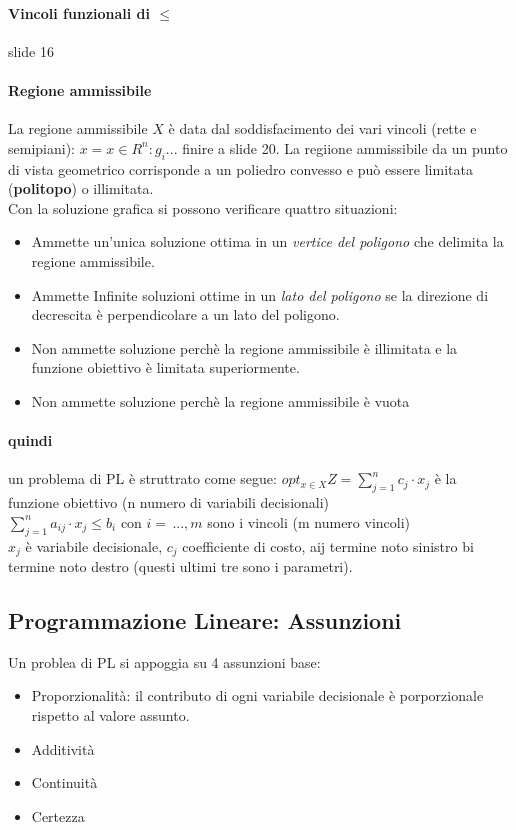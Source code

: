 \documentclass[12pt, a4paper, openany]{book}
\begin{document}
\paragraph*{Vincoli funzionali di $\leq$} slide 16
\paragraph*{Regione ammissibile} La regione ammissibile $X$ è data dal soddisfacimento dei vari vincoli (rette e semipiani):
$x= x\in {R}^n : g_i ...$ finire a slide 20.
La regiione ammissibile da un punto di vista geometrico corrisponde a un poliedro convesso e può essere limitata (\textbf{politopo}) o illimitata.
\\Con la soluzione grafica si possono verificare quattro situazioni:
\begin{itemize}
    \item Ammette un'unica soluzione ottima in un \emph{vertice del poligono} che delimita la regione ammissibile.
    \item Ammette Infinite soluzioni ottime in un \emph{lato del poligono} se la direzione di decrescita è perpendicolare a un lato del poligono.
    \item Non ammette soluzione perchè la regione ammissibile è illimitata e la funzione obiettivo è limitata superiormente.
    \item Non ammette soluzione perchè la regione ammissibile è vuota
\end{itemize}
\paragraph*{quindi} un problema di PL è struttrato come segue:
$opt_{x\in X} Z = \sum_{j=1}^{n} c_j\cdot x_j$ è la funzione obiettivo (n numero di variabili decisionali)
\\ $\sum_{j=1}^n a_{ij} \cdot x_j \leq b_i$ con $i=\,...,m$ sono i vincoli (m numero vincoli)
\\$x_j$ è variabile decisionale, $c_j$ coefficiente di costo, aij termine noto sinistro bi termine noto destro (questi ultimi tre sono i parametri).

\subsection*{Programmazione Lineare: Assunzioni}
Un problea di PL si appoggia su 4 assunzioni base:
\begin{itemize}
    \item Proporzionalità: il contributo di ogni variabile decisionale è porporzionale rispetto al valore assunto.
    \item Additività
    \item Continuità
    \item Certezza
\end{itemize}
\end{document}
